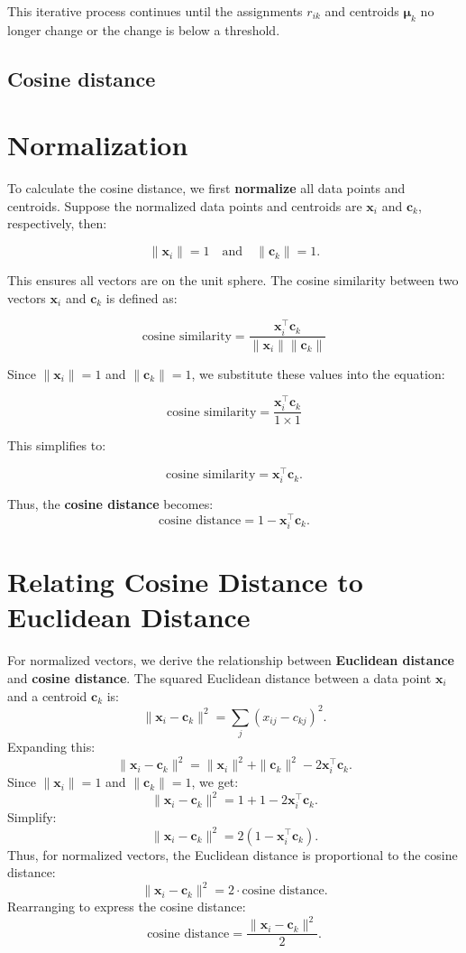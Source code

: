 \documentclass[12pt,twoside,a4paper,parskip]{scrbook} %
\begin{document}
This iterative process continues until the assignments \( r_{ik} \) and centroids \( \boldsymbol{\mu}_k \) no longer change or the change is below a threshold.

\subsection*{Cosine distance}

\section*{Normalization}

To calculate the cosine distance, we first \textbf{normalize} all data points and centroids. Suppose the normalized data points and centroids are \( \mathbf{x}_i \) and \( \mathbf{c}_k \), respectively, then:

\[
\|\mathbf{x}_i\| = 1 \quad \text{and} \quad \|\mathbf{c}_k\| = 1.
\]

This ensures all vectors are on the unit sphere. The cosine similarity between two vectors \( \mathbf{x}_i \) and \( \mathbf{c}_k \) is defined as:

\[
\text{cosine similarity} = \frac{\mathbf{x}_i^\top \mathbf{c}_k}{\|\mathbf{x}_i\| \|\mathbf{c}_k\|}
\]

Since \( \|\mathbf{x}_i\| = 1 \) and \( \|\mathbf{c}_k\| = 1 \), we substitute these values into the equation:

\[
\text{cosine similarity} = \frac{\mathbf{x}_i^\top \mathbf{c}_k}{1 \times 1}
\]

This simplifies to:

\[
\text{cosine similarity} = \mathbf{x}_i^\top \mathbf{c}_k.
\]

Thus, the \textbf{cosine distance} becomes:
\[
\text{cosine distance} = 1 - \mathbf{x}_i^\top \mathbf{c}_k.
\]



\section*{Relating Cosine Distance to Euclidean Distance}

For normalized vectors, we derive the relationship between \textbf{Euclidean distance} and \textbf{cosine distance}. The squared Euclidean distance between a data point \( \mathbf{x}_i \) and a centroid \( \mathbf{c}_k \) is:
\[
\|\mathbf{x}_i - \mathbf{c}_k\|^2 = \sum_{j} (x_{ij} - c_{kj})^2.
\]
Expanding this:
\[
\|\mathbf{x}_i - \mathbf{c}_k\|^2 = \|\mathbf{x}_i\|^2 + \|\mathbf{c}_k\|^2 - 2 \mathbf{x}_i^\top \mathbf{c}_k.
\]
Since \( \|\mathbf{x}_i\| = 1 \) and \( \|\mathbf{c}_k\| = 1 \), we get:
\[
\|\mathbf{x}_i - \mathbf{c}_k\|^2 = 1 + 1 - 2 \mathbf{x}_i^\top \mathbf{c}_k.
\]
Simplify:
\[
\|\mathbf{x}_i - \mathbf{c}_k\|^2 = 2(1 - \mathbf{x}_i^\top \mathbf{c}_k).
\]
Thus, for normalized vectors, the Euclidean distance is proportional to the cosine distance:
\[
\|\mathbf{x}_i - \mathbf{c}_k\|^2 = 2 \cdot \text{cosine distance}.
\]
Rearranging to express the cosine distance:
\[
\text{cosine distance} = \frac{\|\mathbf{x}_i - \mathbf{c}_k\|^2}{2}.
\]
\end{document}
